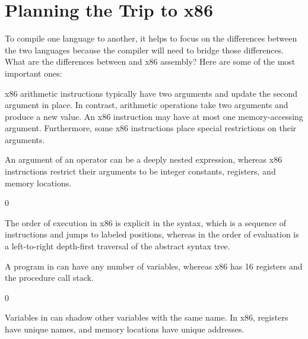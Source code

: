 \documentclass[7x10]{TimesAPriori_MIT}%
\def\racketEd{0}
\def\edition{1}
\numberwithin{theorem}{chapter}
\numberwithin{definition}{chapter}
\numberwithin{equation}{chapter}
\begin{document}
\section{Planning the Trip to x86}
\label{sec:plan-s0-x86}

To compile one language to another, it helps to focus on the
differences between the two languages because the compiler will need
to bridge those differences. What are the differences between \LangVar{}
and x86 assembly? Here are some of the most important ones:

\begin{enumerate}
\item x86 arithmetic instructions typically have two arguments and
  update the second argument in place. In contrast, \LangVar{}
  arithmetic operations take two arguments and produce a new value.
  An x86 instruction may have at most one memory-accessing argument.
  Furthermore, some x86 instructions place special restrictions on
  their arguments.

\item An argument of an \LangVar{} operator can be a deeply nested
  expression, whereas x86 instructions restrict their arguments to be
  integer constants, registers, and memory locations.

{\if\edition\racketEd      
\item The order of execution in x86 is explicit in the syntax, which
  is a sequence of instructions and jumps to labeled positions,
  whereas in \LangVar{} the order of evaluation is a left-to-right
  depth-first traversal of the abstract syntax tree.  \fi}

\item A program in \LangVar{} can have any number of variables,
  whereas x86 has 16 registers and the procedure call stack.
{\if\edition\racketEd    
\item Variables in \LangVar{} can shadow other variables with the
  same name. In x86, registers have unique names, and memory locations
  have unique addresses.
\fi}  
\end{enumerate}
\end{document}

